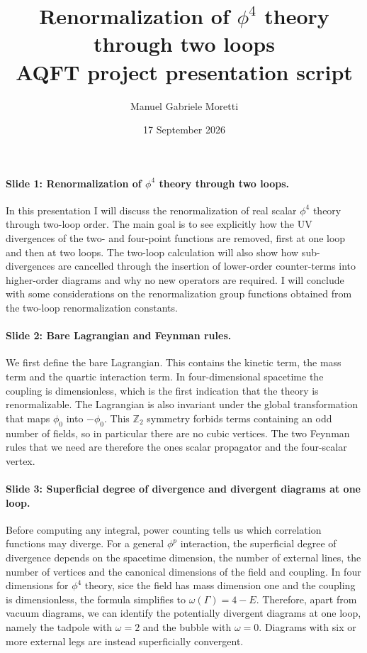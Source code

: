 \documentclass[11pt,a4paper]{article}
\title{\textbf{Renormalization of \texorpdfstring{$\phi^4$}{phi4} theory through two loops} \\ AQFT project presentation script}
\author{Manuel Gabriele Moretti}
\date{17 September 2026}
\begin{document}
\maketitle

\paragraph{Slide 1: Renormalization of $\phi^4$ theory through two loops.}

In this presentation I will discuss the renormalization of real scalar $\phi^4$ theory through two-loop order. The main goal is to see explicitly how the UV divergences of the two- and four-point functions are removed, first at one loop and then at two loops. The two-loop calculation will also show how sub-divergences are cancelled through the insertion of lower-order counter-terms into higher-order diagrams and why no new operators are required. I will conclude with some considerations on the renormalization group functions obtained from the two-loop renormalization constants.

\paragraph{Slide 2: Bare Lagrangian and Feynman rules.}

We first define the bare Lagrangian. This contains the kinetic term, the mass term and the quartic interaction term. In four-dimensional spacetime the coupling is dimensionless, which is the first indication that the theory is renormalizable. The Lagrangian is also invariant under the global transformation that maps $\phi_0$ into $-\phi_0$. This $\mathbb{Z}_2$ symmetry forbids terms containing an odd number of fields, so in particular there are no cubic vertices. The two Feynman rules that we need are therefore the ones scalar propagator and the four-scalar vertex.

\paragraph{Slide 3: Superficial degree of divergence and divergent diagrams at one loop.}

Before computing any integral, power counting tells us which correlation functions may diverge. For a general $\phi^p$ interaction, the superficial degree of divergence depends on the spacetime dimension, the number of external lines, the number of vertices and the canonical dimensions of the field and coupling. In four dimensions for $\phi^4$ theory, sice the field has mass dimension one and the coupling is dimensionless, the formula simplifies to $\omega(\Gamma) = 4 - E$. Therefore, apart from vacuum diagrams, we can identify the potentially divergent diagrams at one loop, namely the tadpole with $\omega = 2$ and the bubble with $\omega = 0$. Diagrams with six or more external legs are instead superficially convergent.
\end{document}
